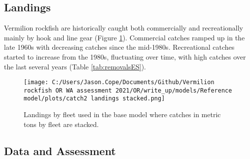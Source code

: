 \documentclass[11pt,
  english,
  a4paper,
]{article}
\begin{document}
\leavevmode\tagmcend\tagstructend\par


\hypertarget{landings}{%
\subsection*{Landings}\label{landings}}

\leavevmode\tagmcend\tagstructend


Vermilion rockfish are historically caught both commercially and recreationally mainly by hook and line gear (Figure \ref{fig:es-catch}). Commercial catches ramped up in the late 1960s with decreasing catches since the mid-1980s. Recreational catches started to increase from the 1980s, fluctuating over time, with high catches over the last several years (Table \ref{tab:removalsES}).

\leavevmode\tagmcend\tagstructend\par

\clearpage




\begin{figure}
\centering
\texttt{[image: C:/Users/Jason.Cope/Documents/Github/Vermilion rockfish OR WA assessment 2021/OR/write\_up/models/Reference model/plots/catch2 landings stacked.png]}
\caption{Landings by fleet used in the base model where catches in metric tons by fleet are stacked.\label{fig:es-catch}}
\end{figure}

\tagmcend\tagstructend

\clearpage


\hypertarget{data-and-assessment}{%
\subsection*{Data and Assessment}\label{data-and-assessment}}

\leavevmode\tagmcend\tagstructend
\end{document}
